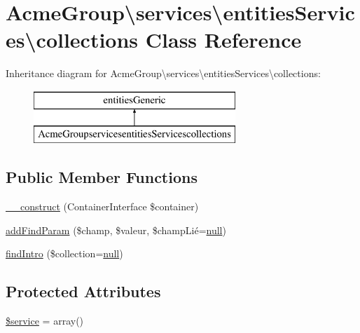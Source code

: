 \hypertarget{class_acme_group_1_1services_1_1entities_services_1_1collections}{\section{Acme\+Group\textbackslash{}services\textbackslash{}entities\+Services\textbackslash{}collections Class Reference}
\label{class_acme_group_1_1services_1_1entities_services_1_1collections}
}
Inheritance diagram for Acme\+Group\textbackslash{}services\textbackslash{}entities\+Services\textbackslash{}collections\+:\begin{figure}[H]
\begin{center}
\leavevmode
\includegraphics[height=2.000000cm]{class_acme_group_1_1services_1_1entities_services_1_1collections}
\end{center}
\end{figure}
\subsection*{Public Member Functions}
\begin{DoxyCompactItemize}
\item 
\hyperlink{class_acme_group_1_1services_1_1entities_services_1_1collections_a4cbb6dd231d3692908e4a3ce677d51f5}{\+\_\+\+\_\+construct} (Container\+Interface \$container)
\item 
\hyperlink{class_acme_group_1_1services_1_1entities_services_1_1collections_a3d9d601bd0277f7e02bc0db354bef97c}{add\+Find\+Param} (\$champ, \$valeur, \$champ\+Lié=\hyperlink{validate_8js_afb8e110345c45e74478894341ab6b28e}{null})
\item 
\hyperlink{class_acme_group_1_1services_1_1entities_services_1_1collections_afc2951c8fbad7be278451852d6cade4a}{find\+Intro} (\$collection=\hyperlink{validate_8js_afb8e110345c45e74478894341ab6b28e}{null})
\end{DoxyCompactItemize}
\subsection*{Protected Attributes}
\begin{DoxyCompactItemize}
\item 
\hyperlink{class_acme_group_1_1services_1_1entities_services_1_1collections_a28fe220d06a0c4a3e94f922546927fab}{\$service} = array()
\end{DoxyCompactItemize}


